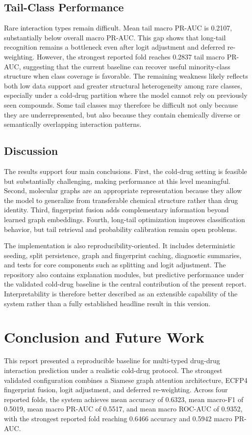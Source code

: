 \documentclass[12pt,a4paper]{report}
\begin{document}
\section{Tail-Class Performance}
Rare interaction types remain difficult. Mean tail macro PR-AUC is 0.2107, substantially below overall macro PR-AUC. This gap shows that long-tail recognition remains a bottleneck even after logit adjustment and deferred re-weighting. However, the strongest reported fold reaches 0.2837 tail macro PR-AUC, suggesting that the current baseline can recover useful minority-class structure when class coverage is favorable. The remaining weakness likely reflects both low data support and greater structural heterogeneity among rare classes, especially under a cold-drug partition where the model cannot rely on previously seen compounds. Some tail classes may therefore be difficult not only because they are underrepresented, but also because they contain chemically diverse or semantically overlapping interaction patterns.

\section{Discussion}
The results support four main conclusions. First, the cold-drug setting is feasible but substantially challenging, making performance at this level meaningful. Second, molecular graphs are an appropriate representation because they allow the model to generalize from transferable chemical structure rather than drug identity. Third, fingerprint fusion adds complementary information beyond learned graph embeddings. Fourth, long-tail optimization improves classification behavior, but tail retrieval and probability calibration remain open problems.

The implementation is also reproducibility-oriented. It includes deterministic seeding, split persistence, graph and fingerprint caching, diagnostic summaries, and tests for core components such as splitting and logit adjustment. The repository also contains explanation modules, but predictive performance under the validated cold-drug baseline is the central contribution of the present report. Interpretability is therefore better described as an extensible capability of the system rather than a fully established headline result in this version.

\chapter{Conclusion and Future Work}
This report presented a reproducible baseline for multi-typed drug-drug interaction prediction under a realistic cold-drug protocol. The strongest validated configuration combines a Siamese graph attention architecture, ECFP4 fingerprint fusion, logit adjustment, and deferred re-weighting. Across four reported folds, the system achieves mean accuracy of 0.6323, mean macro-F1 of 0.5019, mean macro PR-AUC of 0.5517, and mean macro ROC-AUC of 0.9352, with the strongest reported fold reaching 0.6466 accuracy and 0.5942 macro PR-AUC.
\end{document}
